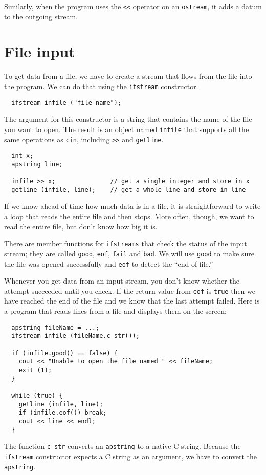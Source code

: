 
Similarly, when the program uses the {\tt <<} operator on
an {\tt ostream}, it adds a datum to the outgoing stream.

\section {File input}
\label{finput}

To get data from a file, we have to create a stream that flows
from the file into the program.  
We can do that using the {\tt ifstream} constructor.

\begin{verbatim}
  ifstream infile ("file-name");
\end{verbatim}
%
The argument for this constructor is a string that
contains the name of the file you want to open.  The result
is an object named {\tt infile} that supports all the same
operations as {\tt cin}, including {\tt >>} and {\tt getline}.

\begin{verbatim}
  int x;
  apstring line;
    
  infile >> x;               // get a single integer and store in x
  getline (infile, line);    // get a whole line and store in line
\end{verbatim}
%
If we know ahead of time how much data is in a file, it is 
straightforward to write a loop that reads the entire file and
then stops.  More often, though, we want to read the entire
file, but don't know how big it is.

There are member functions for {\tt ifstreams} that check the status
of the input stream; they are called {\tt good}, {\tt eof}, {\tt fail}
and {\tt bad}.  We will use {\tt good} to make sure the file was
opened successfully and {\tt eof} to detect the ``end of file.''


Whenever you get data from an input stream, you don't
know whether the attempt succeeded until you check.  If the
return value from {\tt eof} is {\tt true} then we have reached
the end of the file and we know that the last attempt failed.
Here is a program that reads lines from a file and displays
them on the screen:

\begin{verbatim}
  apstring fileName = ...;
  ifstream infile (fileName.c_str());

  if (infile.good() == false) {
    cout << "Unable to open the file named " << fileName;
    exit (1);
  }

  while (true) {
    getline (infile, line);
    if (infile.eof()) break;
    cout << line << endl;
  }
\end{verbatim}
%
The function {\tt c\_str} converts an {\tt apstring} to a
native C string.  Because the {\tt ifstream} constructor
expects a C string as an argument, we have to convert
the {\tt apstring}.

